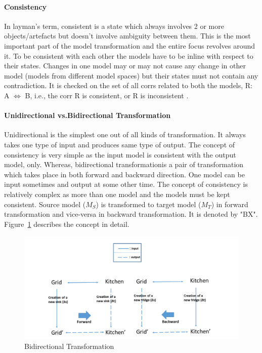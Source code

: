 \paragraph{Consistency} In layman's term, consistent is a state which always involves 2 or more objects/artefacts but doesn't involve ambiguity between them. This is the most important part of the model transformation and the entire focus revolves around it. To be consistent with each other the models have to be inline with respect to their states. Changes in one model may or may not cause any change in other model (models from different model spaces) but their states must not contain any contradiction. It is checked on the set of all corrs related to both the models,
R: A $\Longleftrightarrow$ B, i.e., the corr R is consistent, or R is inconsistent \cite{benchmarx-reload}.

\paragraph{Unidirectional vs.Bidirectional Transformation}  Unidirectional is the simplest one out of all kinds of transformation. It always takes one type of input and produces same type of output. The concept of consistency is very simple as the input model is consistent with the output model, only.
\newline Whereas, bidirectional transformationis a pair of transformation which takes place in both forward and backward direction. One model can be input sometimes and output at some other time. The concept of consistency is relatively complex as more than one model and the models must be kept consistent. Source model ($M_{S}$) is transformed to target model ($M_{T}$) in forward transformation and vice-versa in backward transformation. It is denoted by "BX". 
\newline Figure~\ref{fig:BX_Diagram} describes the concept in detail.
\begin{figure}
	\includegraphics[width=1\textwidth]{figures/BX}
	\caption{Bidirectional Transformation}
	\label{fig:BX_Diagram}
\end{figure}


